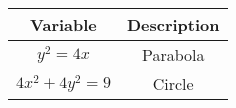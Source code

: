 \begin{tabular}[12pt]{ |c| c|}
    \hline
    \textbf{Variable} & \textbf{Description}\\ 
    \hline 
    $y^2 = 4x$ & Parabola\\
    \hline
    $4x^2 + 4y^2 = 9$ & Circle\\
    \hline
\end{tabular}
